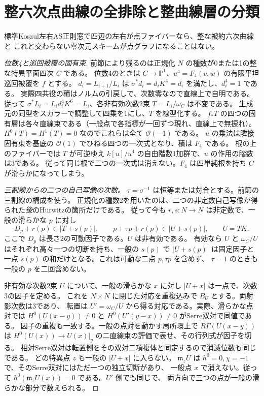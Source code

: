 \section{整六次点曲線の全排除と整曲線層の分類}
\label{sec:integral-sextic-exclusion}
\begin{theorem}\label{thm:integral-sextic-exclusion}
標準Koszul左右AS正則窓で四辺の左右が点ファイバーなら、整な被約六次曲線と
これと交わらない零次元スキームが点グラフになることはない。
\end{theorem}
\begin{proof}[位数4と巡回被覆の固有束]
前節により残るのは正規化 $N$ の種数が0または1の整な特異平面四次 $C$ である。
位数4のときは $C\to\mathbb P^1$、$u^4=F_4(v,w)$ の有限平坦巡回被覆を $f$ とする。
$d_i=L_{i+1}/L_i$ は $\sigma^*d_i=d_iK^4=d_i$ を満たし、$d_i^4=1$ である。
実際四共役の積はノルムの引戻しで、次数零なので直線上で自明である。
従って $\sigma^*L_i=L_i d_i^4K^6=L_i$、各非有効次数2束 $T=L_i/\omega_C$ は不変である。
生成元の同型をスカラーで調整して四乗を1にし、$T$ を線型化する。
$f_*T$ の四つの固有層は各々直線束である（一般点で各指標が一回ずつ現れ、直線上で無捩れ）。
$H^0(T)=H^1(T)=0$ なのでこれらは全て $\mathcal O(-1)$ である。
$u$ の乗法は隣接固有束を基底の $\mathcal O(1)$ でひねる四つの一次式となり、積は $F_4$ である。
根の上のファイバーでは $T$ が可逆ゆえ $k[u]/u^4$ の自由階数1加群で、$u$ の作用の階数は3である。
従って同じ根で二つの一次式は消えない。$F_4$ は四単純根を持ち $C$ が滑らかになってしまう。

\smallskip
\noindent\textit{三割線からの二つの自己写像の次数。}
$\tau=\sigma^{-1}$ は恒等または対合とする。前節の三割線の構成を使う。
正規化の種数2を用いたのは、二つの非定数自己写像が得られた\emph{後}のHurwitzの箇所だけである。
従って今も $r,s:N\to N$ は非定数で、一般の滑らかな $p$ に対し
\[
 D_p+r(p)\in |T+s(p)|,\qquad p+\tau p+r(p)\in |U+s(p)|,\qquad
 U=T K .
\]
ここで $D_p$ は長さ2の可動因子である。$U$ は非有効である。
有効なら $U$ と $\omega_C/U$ はそれぞれ高々一つの切断を持ち、一般の $s(p)$ で
$|U+s(p)|$ は固定因子と一点 $s(p)$ の和だけとなる。これは可動な二点 $p,\tau p$ を含めず、
$\tau=1$ のときも一般の $p$ を二回含めない。

非有効な次数2束 $U$ について、一般の滑らかな $x$ に対し $|U+x|$ は一点で、次数3の因子を定める。
これを $N\times N$ に閉じた対応を重複込みで $B_U$ とする。両射影次数は3であり、
転置は $U'=\omega_C/U$ から得る対応である。実際、滑らかな点対では
$H^0(U(x-y))\ne0$ と $H^0(U'(y-x))\ne0$ がSerre双対で同値である。
因子の重複も一致する。一般の点対を動かす局所環上で $R\Gamma(U(x-y))$ は
$H^0(U(x))\to U(x)|_y$ の二直線束の評価で表せ、その行列式が因子を切る。
相対Serre双対は転置側をその双対二項複体と同定するので消滅位数も同じである。
どの特異点 $z$ も一般の $|U+x|$ に入らない。
$\mathfrak m_z U$ は $h^0=0,\chi=-1$ で、そのSerre双対にはただ一つの独立切断があり、
一般点 $x$ で消えない。従って $h^0(\mathfrak m_z U(x))=0$ である。$U'$ 側でも同じで、
両方向で三つの点が一般の滑らかな部分で数えられる。


\end{proof}
